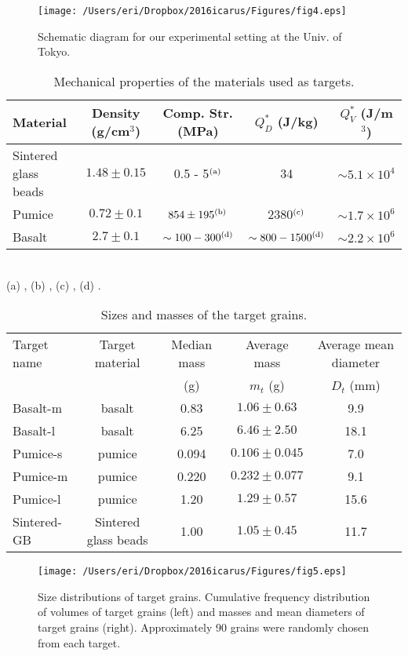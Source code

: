\documentclass[3p,authoryear]{elsarticle}
\begin{document}
\begin{figure}[htbp]
	\begin{center}
	\texttt{[image: /Users/eri/Dropbox/2016icarus/Figures/fig4.eps]}
	\caption{Schematic diagram for our experimental setting at the Univ. of Tokyo. }
	\label{schematic-exp}
	\end{center}
\end{figure}
\begin{table*}
	\caption{Mechanical properties of the materials used as targets.}
	\label{material}
	\begin{center}
	\small
	\begin{tabular}{lcccc}\hline
	Material & Density (g/cm$^3$) & Comp. Str. (MPa) & $Q_D^*$ (J/kg) & $Q_V^*$ (J/m$^3$) \\ \hline
	Sintered glass beads & $1.48\pm0.15$ & 0.5 - 5$^{\rm (a)}$ & 34 & $\sim 5.1\times 10^4$\\
	Pumice & $0.72 \pm 0.1$ & $854\pm 195^{\rm (b)}$& 2380$^{\rm (c)}$& $\sim 1.7\times 10^6$\\
	Basalt &$2.7\pm0.1$ & $\sim 100-300^{\rm (d)}$&$\sim 800 -1500^{\rm (d)}$& $\sim 2.2\times 10^6$\\
	 \hline
	\end{tabular}\\
	(a) \citet{setoh2010}, (b) \citet{patmore2014}, (c) \citet{flynn2015}, (d) \citet{takagi1984,HH1999}.
	\end{center}
\end{table*}
%
\begin{table*}[btp]
	\caption{Sizes and masses of the target grains.}
	\centering
	\small
	\begin{tabular}{lcccc} \hline
	Target name &Target material & Median mass & Average mass& Average mean diameter\\
	& &(g) &$m_t$ (g)& $D_t$ (mm) \\ \hline
	Basalt-m & basalt & 0.83 & $1.06\pm 0.63$ & 9.9\\
	Basalt-l & basalt & 6.25 & $6.46 \pm 2.50$ & 18.1\\
	Pumice-s& pumice & 0.094 & $0.106\pm0.045$ & 7.0\\
	Pumice-m & pumice & 0.220 & $0.232\pm0.077$ &9.1 \\
	Pumice-l & pumice & 1.20 & $1.29\pm 0.57$ & 15.6\\
	Sintered-GB & Sintered glass beads & 1.00 & $1.05 \pm 0.45$ & 11.7\\
	\hline
	\end{tabular}
	\centering
\end{table*}
\begin{figure*}[tbp]
	\begin{center}
	\texttt{[image: /Users/eri/Dropbox/2016icarus/Figures/fig5.eps]}
	\caption{Size distributions of target grains. Cumulative frequency distribution of volumes of target grains (left) and masses and mean diameters of target grains (right). Approximately 90 grains were randomly chosen from each target.}
	\label{grainsize-CDF}
	\end{center}
\end{figure*}
\end{document}
